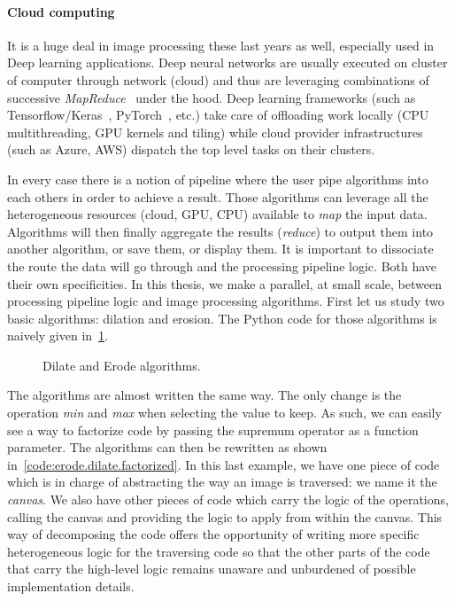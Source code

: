 \paragraph{Cloud computing} It is a huge deal in image processing these last years as well, especially used in Deep
learning applications. Deep neural networks are usually executed on cluster of computer through network (cloud) and thus
are leveraging combinations of successive \emph{MapReduce}~\parencite{dean.2008.mapreduce} under the hood. Deep learning
frameworks (such as Tensorflow/Keras~\parencite{tensorflow.2015.whitepaper,chollet.2015.keras,gulli.2017.deep},
PyTorch~\parencite{paszke.2019.pytorch}, etc.) take care of offloading work locally (CPU multithreading, GPU kernels and
tiling) while cloud provider infrastructures (such as Azure, AWS) dispatch the top level tasks on their clusters.

\bigskip

In every case there is a notion of pipeline where the user pipe algorithms into each others in order to achieve a
result. Those algorithms can leverage all the heterogeneous resources (cloud, GPU, CPU) available to \emph{map} the
input data. Algorithms will then finally aggregate the results (\emph{reduce}) to output them into another algorithm, or
save them, or display them. It is important to dissociate the route the data will go through and the processing pipeline
logic. Both have their own specificities. In this thesis, we make a parallel, at small scale, between processing
pipeline logic and image processing algorithms. First let us study two basic algorithms: dilation and erosion. The
Python code for those algorithms is naively given in~\cref{code:erode.dilate}.

\begin{figure}[htbp]
  \centering
  \hfil
  \caption{Dilate and Erode algorithms.}
  \label{code:erode.dilate}
\end{figure}

The algorithms are almost written the same way. The only change is the operation \emph{min} and \emph{max} when
selecting the value to keep. As such, we can easily see a way to factorize code by passing the supremum operator as a
function parameter. The algorithms can then be rewritten as shown in~\cref{code:erode.dilate.factorized}. In this last
example, we have one piece of code which is in charge of abstracting the way an image is traversed: we name it the
\emph{canvas}. We also have other pieces of code which carry the logic of the operations, calling the canvas and
providing the logic to apply from within the canvas. This way of decomposing the code offers the opportunity of writing
more specific heterogeneous logic for the traversing code so that the other parts of the code that carry the high-level
logic remains unaware and unburdened of possible implementation details.

